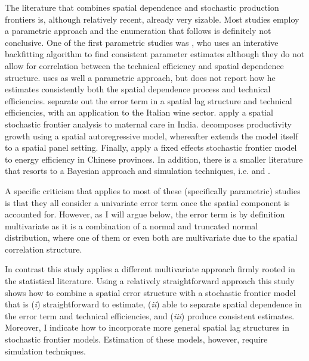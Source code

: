 \documentclass[11pt,parskip,abstracton,notitlepage]{scrartcl}
\begin{document}
The literature that combines spatial dependence and stochastic production frontiers is, although relatively recent, already very sizable. Most studies employ a parametric approach and the enumeration that follows is definitely not conclusive. One of the first parametric studies was \citet{BARRIOS2010}, who uses an interative backfitting algorithm to find consistent parameter estimates although they do not allow for correlation between the technical efficiency and spatial dependence structure. \citet{PAVLYUK2010} uses as well a parametric approach, but does not report how he estimates consistently both the spatial dependence process and technical efficiencies.  \citet{fusco2013spatial} separate out the error term in a spatial lag structure and technical efficiencies, with an application to the Italian wine sector. \citet{kinfu2015inefficiency} apply a spatial stochastic frontier analysis to maternal care in India. \citet{glass2013productivity} decomposes productivity growth using a spatial autoregressive model, whereafter \citet{glass2016spatial} extends the model itself to a spatial panel setting. Finally, \citet{jiang2017energy} apply a fixed effects stochastic frontier model to energy efficiency in Chinese provinces. In addition, there is a smaller literature that resorts to a Bayesian approach and simulation techniques, i.e. \citet{SCHMIDT2009} and \citet{AREAL2010}.  

A specific criticism that applies to most of these (specifically parametric) studies is that they all consider a univariate error term once the spatial component is accounted for. However, as I will argue below, the error term is by definition multivariate as it is a combination of a normal and truncated normal distribution, where one of them or even both are multivariate due to the spatial correlation structure. 

In contrast this study applies a different multivariate approach firmly rooted in the statistical literature. Using a relatively straightforward approach this study shows how to combine a spatial error structure with a stochastic frontier model that is (\emph{i}) straightforward to estimate, (\emph{ii}) able to separate spatial dependence in the error term and technical efficiencies, and (\emph{iii}) produce consistent estimates. Moreover, I indicate how to incorporate more general spatial lag structures in stochastic frontier models. Estimation of these models, however, require simulation techniques.
\end{document}
